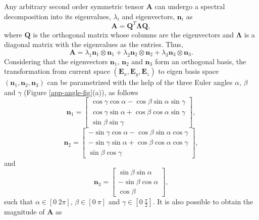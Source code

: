 Any arbitrary second order symmetric tensor $ \textbf{A} $ can undergo a spectral decomposition into its eigenvalues, $ \lambda_i $ and eigenvectors, $ \textbf{n}_i $ as
\begin{equation}\label{app-angle-1-1}
\textbf{A} = \textbf{Q}^T\boldsymbol\Lambda\textbf{Q},
\end{equation}
where $ \textbf{Q} $ is the orthogonal matrix whose columns are the eigenvectors and $ \boldsymbol\Lambda $ is a diagonal matrix with the eigenvalues as the entries. Thus,
\begin{equation}\label{app-angle-1}
\textbf{A}=\lambda_1\textbf{n}_1\otimes\textbf{n}_1+\lambda_2\textbf{n}_2\otimes\textbf{n}_2+\lambda_3\textbf{n}_3\otimes\textbf{n}_3.
\end{equation}
Considering that the eigenvectors $ \textbf{n}_1 $, $ \textbf{n}_2 $ and $ \textbf{n}_3 $ form an orthogonal basis, the transformation from current space $ (\textbf{E}_x,\textbf{E}_y,\textbf{E}_z) $ to eigen basis space $ (\textbf{n}_1,\textbf{n}_2,\textbf{n}_3) $ can be parametrized with the help of the three Euler angles $ \alpha $, $ \beta $ and $ \gamma $ (Figure \ref{app-angle-fig}(a)), as follows
\begin{equation}\label{app-angle-2}
\textbf{n}_1=\left[
\begin{array}{c}
\cos\gamma\cos\alpha-\cos\beta\sin\alpha\sin\gamma\\
\cos\gamma\sin\alpha+\cos\beta\cos\alpha\sin\gamma\\
\sin\beta\sin\gamma
\end{array}
\right],
\end{equation}
\begin{equation}\label{app-angle-3}
\textbf{n}_2=\left[
\begin{array}{c}
-\sin\gamma\cos\alpha-\cos\beta\sin\alpha\cos\gamma\\
-\sin\gamma\sin\alpha+\cos\beta\cos\alpha\cos\gamma\\
\sin\beta\cos\gamma
\end{array}
\right],
\end{equation}
and
\begin{equation}\label{app-angle-4}
\textbf{n}_3=\left[
\begin{array}{c}
\sin\beta\sin\alpha\\
-\sin\beta\cos\alpha\\
\cos\beta
\end{array}
\right],
\end{equation}
such that $ \alpha\in\left[0\ 2\pi\right] $, $ \beta\in\left[0\ \pi\right] $ and $ \gamma\in\left[0\ \frac{\pi}{2}\right] $. It is also possible to obtain the magnitude of $ \textbf{A} $ as
